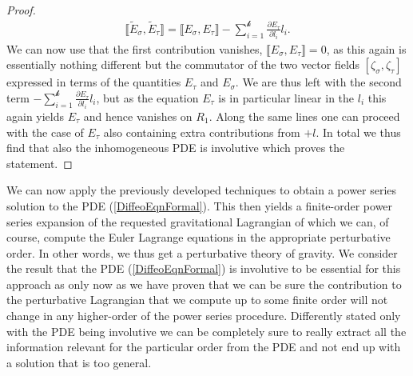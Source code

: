\begin{proof}
\begin{align}
    \llbracket \tilde{E}_{\sigma}, \tilde{E}_{\tau} \rrbracket = \llbracket E_{\sigma}, E_{\tau} \rrbracket - \sum_{i=1}^{\mathcal{k}} \frac{\partial E_{\tau}}{\partial l_i} l_i.
\end{align}
We can now use that the first contribution vanishes, $\llbracket E_{\sigma}, E_{\tau} \rrbracket = 0$, as this again is essentially nothing different but the commutator of the two vector fields $[\zeta_{\sigma},\zeta_{\tau}]$ expressed in terms of the quantities $E_{\tau}$ and $E_{\sigma}$. We are thus left with the second term $- \sum_{i=1}^{\mathcal{k}} \frac{\partial E_{\tau}}{\partial l_i} l_i$, but as the equation $E_{\tau}$ is in particular linear in the $l_i$ this again yields $E_{\tau}$ and hence vanishes on $R_1$. Along the same lines one can proceed with the case of $E_{\tau}$ also containing extra contributions from $+l$. In total we thus find that also the inhomogeneous PDE is involutive which proves the statement.
\end{proof}

We can now apply the previously developed techniques to obtain a power series solution to the PDE (\ref{DiffeoEqnFormal}). This then yields a finite-order power series expansion of the requested gravitational Lagrangian of which we can, of course, compute the Euler Lagrange equations in the appropriate perturbative order. In other words, we thus get a perturbative theory of gravity. We consider the result that the PDE (\ref{DiffeoEqnFormal}) is involutive to be essential for this approach as only now as we have proven that we can be sure the contribution to the perturbative Lagrangian that we compute up to some finite order will not change in any higher-order of the power series procedure. Differently stated only with the PDE being involutive we can be completely sure to really extract all the information relevant for the particular order from the PDE and not end up with a solution that is too general. 


